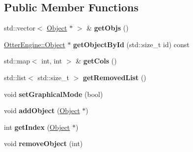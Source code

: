 \subsection*{Public Member Functions}
\begin{DoxyCompactItemize}
\item 
std\+::vector$<$ \hyperlink{class_otter_engine_1_1_object}{Object} $\ast$ $>$ \& {\bfseries get\+Objs} ()\hypertarget{class_otter_engine_1_1_engine_a7606bcd6283315e10f7c216f5627b0d2}{}\label{class_otter_engine_1_1_engine_a7606bcd6283315e10f7c216f5627b0d2}

\item 
\hyperlink{class_otter_engine_1_1_object}{Otter\+Engine\+::\+Object} $\ast$ {\bfseries get\+Object\+By\+Id} (std\+::size\+\_\+t id) const \hypertarget{class_otter_engine_1_1_engine_ad52a99c3e764acad36936248eb944d34}{}\label{class_otter_engine_1_1_engine_ad52a99c3e764acad36936248eb944d34}

\item 
std\+::map$<$ int, int $>$ \& {\bfseries get\+Cols} ()\hypertarget{class_otter_engine_1_1_engine_ae759d0abb92333efd0ecaea36948633d}{}\label{class_otter_engine_1_1_engine_ae759d0abb92333efd0ecaea36948633d}

\item 
std\+::list$<$ std\+::size\+\_\+t $>$ {\bfseries get\+Removed\+List} ()\hypertarget{class_otter_engine_1_1_engine_aed5529552ce2f46788dbb8b5ce1e0a72}{}\label{class_otter_engine_1_1_engine_aed5529552ce2f46788dbb8b5ce1e0a72}

\item 
void {\bfseries set\+Graphical\+Mode} (bool)\hypertarget{class_otter_engine_1_1_engine_a00ee7d09a6347845f8bdfffeb98516f0}{}\label{class_otter_engine_1_1_engine_a00ee7d09a6347845f8bdfffeb98516f0}

\item 
void {\bfseries add\+Object} (\hyperlink{class_otter_engine_1_1_object}{Object} $\ast$)\hypertarget{class_otter_engine_1_1_engine_a04298e6d1019291d6985ce1eaaf40bfe}{}\label{class_otter_engine_1_1_engine_a04298e6d1019291d6985ce1eaaf40bfe}

\item 
int {\bfseries get\+Index} (\hyperlink{class_otter_engine_1_1_object}{Object} $\ast$)\hypertarget{class_otter_engine_1_1_engine_a7139f1dadfbc9c0b1941f9db978e96a3}{}\label{class_otter_engine_1_1_engine_a7139f1dadfbc9c0b1941f9db978e96a3}

\item 
void {\bfseries remove\+Object} (int)\hypertarget{class_otter_engine_1_1_engine_ab92b46d8c0f47f7357b9706f7a5fa7c9}{}\label{class_otter_engine_1_1_engine_ab92b46d8c0f47f7357b9706f7a5fa7c9}


\end{DoxyCompactItemize}
